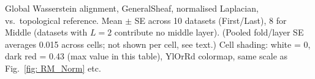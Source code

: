 \begin{table}[H]
\begin{minipage}{0.15\textwidth}
\end{minipage}
\caption{Global Wasserstein alignment, GeneralSheaf, normalised Laplacian, vs.\ topological reference. Mean $\pm$ SE across 10 datasets (First/Last), 8 for Middle (datasets with $L=2$ contribute no middle layer). (Pooled fold/layer SE averages 0.015 across cells; not shown per cell, see text.) Cell shading: white = 0, dark red = 0.43 (max value in this table), YlOrRd colormap, same scale as Fig.~\ref{fig: RM_Norm} etc.}
\label{tab:global_general_norm}
\end{table}
